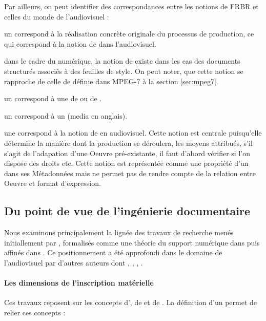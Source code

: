 Par ailleurs, on peut identifier des correspondances entre les notions de FRBR et celles du monde de l'audiovisuel :
\begin{liste}
	\item un  correspond à la réalisation concrète originale du processus de production, ce qui correspond à la notion de  dans l'audiovisuel.
	
	\item dans le cadre du numérique, la notion de  existe dans les cas des documents structurés associés à des feuilles de style.
	On peut noter, que cette notion se rapproche de celle de  définie dans MPEG-7 à la section \ref{sec:mpeg7}.

	\item un  correspond à une  de  ou de .
	\item un  correspond à un  (media en anglais).

	\item une  correspond à la notion de  en audiovisuel.
	Cette notion est centrale puisqu'elle détermine la manière dont la production se déroulera, les moyens attribués, s'il s'agit de l'adapation d'une Oeuvre pré-existante, il faut d'abord vérifier si l'on dispose des droits etc.
	Cette notion est représentée comme une propriété d'un  dans ses Métadonnées mais ne permet pas de rendre compte de la relation entre Oeuvre et format d'expression.
\end{liste}





\subsection{Du point de vue de l'ingénierie documentaire}\label{sec:pv-id}
Nous examinons principalement la lignée des travaux de recherche menés initiallement par \cite{Bachimont1998}, formalisés comme une théorie du support numérique dans \cite{bachimont:hdr} puis affinés dans \cite{bachimont:icc}. 
Ce positionnement a été approfondi dans le domaine de l'audiovisuel par d'autres auteurs dont \cite{Prie1999}, \cite{Troncy2004}, \cite{Morizet-mahoudeaux2005a}, \cite{Gaillard2008}.

\paragraph{Les dimensions de l'inscription matérielle}
Ces travaux reposent sur les concepts d', de  et de . 
La définition d'un  permet de relier ces concepts : 
 

